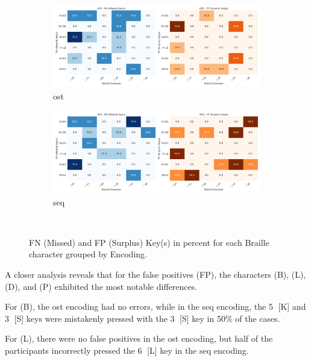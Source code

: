 \begin{figure}[h!]
    \centering
    \begin{subfigure}[b]{0.45\textwidth}
        \centering
        \includegraphics[width=\textwidth]{src/pictures/Study2Data_Experiment/missed_surplus_test_percentages_study2_ost.pdf}
        \caption{\gls{ost}}
    \end{subfigure}
    \begin{subfigure}[b]{0.45\textwidth}
        \centering
        \includegraphics[width=\textwidth]{src/pictures/Study2Data_Experiment/missed_surplus_test_percentages_study2_seq.pdf}
        \caption{\gls{seq}}
    \end{subfigure}\\
    \caption{FN (Missed) and FP (Surplus) Key(s) in percent for each Braille character grouped by Encoding.}
    \label{fig:missed_surplus_percentages_study2}
\end{figure}

A closer analysis reveals that for the false positives (FP), the characters (B), (L), (D), and (P) exhibited the most notable differences.

For (B), the \gls{ost} encoding had no errors, while in the \gls{seq} encoding, the \textcircled{5} [K] and \textcircled{3} [S] keys were mistakenly pressed with the \textcircled{3} [S] key in 50\% of the cases.

For (L), there were no false positives in the \gls{ost} encoding, but half of the participants incorrectly pressed the \textcircled{6} [L] key in the \gls{seq} encoding.

